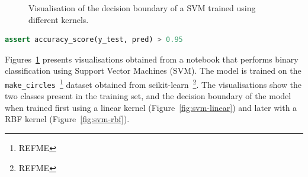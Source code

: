 \documentclass[conference]{IEEEtran}
\begin{document}

\begin{figure}
  \hfill
  \caption{Visualisation of the decision boundary of a SVM trained using different kernels.}
  \label{fig:svm}
\end{figure}
\begin{lstlisting}[language=Python]
assert accuracy_score(y_test, pred) > 0.95
\end{lstlisting}
\label{lst:svm}

Figures~\ref{fig:svm} presents visualisations obtained from a notebook that performs binary classification using Support Vector Machines (SVM). The model is trained on the \texttt{make\_circles}~\footnote{REFME} dataset obtained from scikit-learn~\footnote{REFME}. The visualisations show the two classes present in the training set, and the decision boundary of the model when trained first using a linear kernel (Figure~\ref{fig:svm-linear}) and later with a RBF kernel (Figure~\ref{fig:svm-rbf}).

\end{document}
